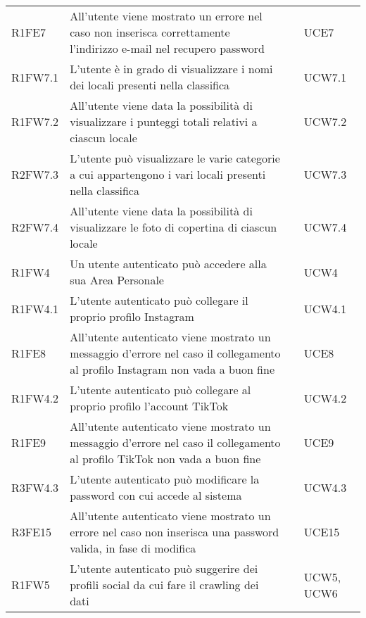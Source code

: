 \begin{longtable}{ m{}<{\centering}  m{}<{\centering}  m{}<{\centering}  m{}<{\centering}}
	R1FE7 & All’utente viene mostrato un errore nel caso non inserisca correttamente l’indirizzo e-mail nel recupero password & \Ob & UCE7\\
	
	R1FW7.1 & L’utente è in grado di visualizzare i nomi dei locali presenti nella classifica & \Ob & UCW7.1 \\
	
	R1FW7.2 & All’utente viene data la possibilità di visualizzare i punteggi totali relativi a ciascun locale & \Ob & UCW7.2 \\
	
	R2FW7.3 & L’utente può visualizzare le varie categorie a cui appartengono i vari locali presenti nella classifica & \De & UCW7.3 \\
	
	R2FW7.4 & All’utente viene data la possibilità di visualizzare le foto di copertina di ciascun locale & \De & UCW7.4 \\

	R1FW4 &	Un utente autenticato può accedere alla sua Area Personale & \Ob & UCW4 \\ 
	 
	R1FW4.1 & L’utente autenticato può collegare il proprio profilo Instagram  & \Ob & UCW4.1\\	
	 
	R1FE8 & All’utente autenticato viene mostrato un messaggio d’errore nel caso il collegamento al profilo Instagram non vada a buon fine & \Ob & UCE8\\	
	 
	R1FW4.2 & L’utente autenticato può collegare al proprio profilo l’account TikTok & \Ob & UCW4.2\\		 

	R1FE9 & All’utente autenticato viene mostrato un messaggio d’errore nel caso il collegamento al profilo TikTok non vada a buon fine  & \Ob & UCE9 \\		
	 
	R3FW4.3 & L’utente autenticato può modificare la password con cui accede al sistema & \Fa & UCW4.3\\				
	 
	R3FE15 & All’utente autenticato viene mostrato un errore nel caso non inserisca una password valida, in fase di modifica  & \Fa & UCE15\\			
	  	 	 	
	R1FW5 & L’utente autenticato può suggerire dei profili social da cui fare il crawling dei dati & \Ob & UCW5, UCW6\\		
	 

\end{longtable}
